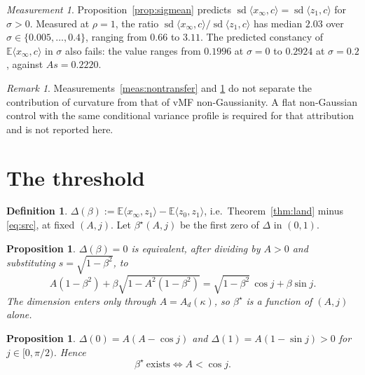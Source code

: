 \documentclass[11pt]{article}
\newtheorem{proposition}[lemma]{Proposition}
\theoremstyle{definition}
\newtheorem{definition}[lemma]{Definition}
\theoremstyle{remark}
\newtheorem{remark}[lemma]{Remark}
\newtheorem{measurement}[lemma]{Measurement}
\DeclareMathOperator{\sd}{sd}
\newcommand{\E}{\mathbb{E}}
\begin{document}
\begin{measurement}\label{meas:gainsphere}
Proposition~\ref{prop:sigmean} predicts
$\sd\langle x_\infty,c\rangle=\sd\langle z_1,c\rangle$ for $\sigma>0$. Measured at $\rho=1$, the
ratio $\sd\langle x_\infty,c\rangle/\sd\langle z_1,c\rangle$ has median $2.03$ over
$\sigma\in\{0.005,\dots,0.4\}$, ranging from $0.66$ to $3.11$. The predicted constancy of
$\E\langle x_\infty,c\rangle$ in $\sigma$ also fails: the value ranges from $0.1996$ at $\sigma=0$
to $0.2924$ at $\sigma=0.2$, against $As=0.2220$.
\end{measurement}

\begin{remark}\label{rem:attribution}
Measurements~\ref{meas:nontransfer} and \ref{meas:gainsphere} do not separate the contribution of
curvature from that of vMF non-Gaussianity. A flat non-Gaussian control with the same conditional
variance profile is required for that attribution and is not reported here.
\end{remark}

\section{The threshold}\label{sec:bstar}

\begin{definition}\label{def:delta}
$\Delta(\beta):=\E\langle x_\infty,z_1\rangle-\E\langle z_0,z_1\rangle$, i.e.\
Theorem~\ref{thm:land} minus \eqref{eq:src}, at fixed $(A,j)$. Let $\beta^{\star}(A,j)$ be the
first zero of $\Delta$ in $(0,1)$.
\end{definition}

\begin{proposition}\label{prop:bstar}
$\Delta(\beta)=0$ is equivalent, after dividing by $A>0$ and substituting $s=\sqrt{1-\beta^{2}}$, to
\begin{equation}\label{eq:bstar}
A(1-\beta^{2})+\beta\sqrt{1-A^{2}(1-\beta^{2})}=\sqrt{1-\beta^{2}}\,\cos j+\beta\sin j.
\end{equation}
The dimension enters only through $A=A_d(\kappa)$, so $\beta^{\star}$ is a function of $(A,j)$ alone.
\end{proposition}

\begin{proposition}\label{prop:exist}
$\Delta(0)=A(A-\cos j)$ and $\Delta(1)=A(1-\sin j)>0$ for $j\in[0,\pi/2)$. Hence
\[
\beta^{\star}\ \text{exists}\iff A<\cos j.
\]
\end{proposition}
\end{document}
